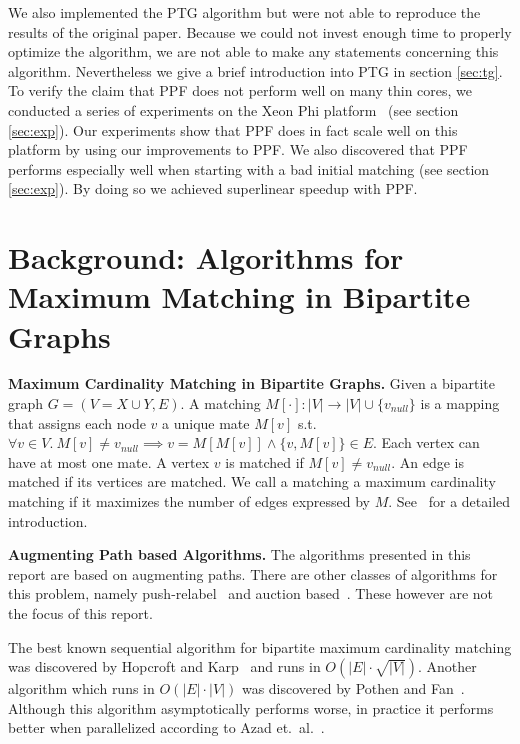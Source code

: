 \documentclass[letterpaper]{article}
\newcommand{\mypar}[1]{{\bf #1.}}
\begin{document}
We also implemented the PTG algorithm but were not able to reproduce the results of the original paper. 
Because we could not invest enough time to properly optimize the algorithm, we are not able to make any statements concerning this algorithm.
Nevertheless we give a brief introduction into PTG in section \ref{sec:tg}.\\

To verify the claim that PPF does not perform well on many thin cores, we conducted a series of experiments on the Xeon Phi platform~\cite{XeonPhi} (see section \ref{sec:exp}). 
Our experiments show that PPF does in fact scale well on this platform by using our improvements to PPF. We also discovered that PPF
performs especially well when starting with a bad initial matching (see section \ref{sec:exp}). 
By doing so we achieved superlinear speedup with PPF.

\section{Background: Algorithms for Maximum Matching in Bipartite Graphs}\label{sec:background}

\mypar{Maximum Cardinality Matching in Bipartite Graphs}
Given a bipartite graph $G = (V = X \cup Y, E)$.
A matching $M[\cdot]: |V| \rightarrow |V| \cup \{v_{null}\}$ is a mapping that assigns each node $v$ a unique mate $M[v]$ s.t. 
$\forall v \in V.\ M[v] \neq v_{null} \implies v = M[M[v]] \wedge \{v, M[v]\} \in E$.
Each vertex can have at most one mate. A vertex $v$ is matched if $M[v] \neq v_{null}$. An edge is matched if its vertices are matched. 
We call a matching a maximum cardinality matching if it maximizes the number of edges expressed by $M$. See~\cite{intro_alg} for a detailed introduction.

\mypar{Augmenting Path based Algorithms}
The algorithms presented in this report are based on augmenting paths. 
There are other classes of algorithms for this problem, namely push-relabel~\cite{GoldbergT88} and auction based~\cite{Bertsekas}. 
These however are not the focus of this report. 

The best known sequential algorithm for bipartite maximum cardinality matching was discovered by Hopcroft and Karp~\cite{HK:1973}
and runs in $O(|E|\cdot \sqrt{|V|})$. Another algorithm which runs in $O(|E|\cdot|V|)$ was discovered by Pothen and Fan~\cite{Pothen:1990}.
Although this algorithm asymptotically performs worse, in practice it performs better when parallelized according to Azad et.\ al.~\cite{Azad:2012}.
\end{document}
